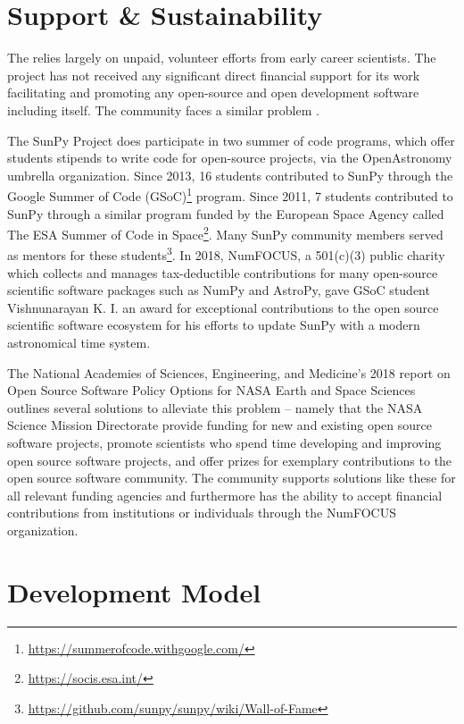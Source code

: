 \section{Support \& Sustainability}

The \sunpyproj relies largely on unpaid, volunteer efforts from early career scientists. 
The project has not received any significant direct financial support for its work facilitating and promoting any open-source and open development software including \sunpy itself. 
The \astropy community faces a similar problem \citep{PriceWhelan:2018ji, Muna2016}. 

The SunPy Project does participate in two summer of code programs, which offer students stipends to write code for open-source projects, via the OpenAstronomy umbrella organization. 
Since 2013, 16 students contributed to SunPy through the Google Summer of Code (GSoC)\footnote{\url{https://summerofcode.withgoogle.com/}} program. 
Since 2011, 7 students contributed to SunPy through a similar program funded by the European Space Agency called The ESA Summer of Code in Space\footnote{\url{https://socis.esa.int/}}. 
Many SunPy community members served as mentors for these students\footnote{\url{https://github.com/sunpy/sunpy/wiki/Wall-of-Fame}}. 
In 2018, NumFOCUS, a 501(c)(3) public charity which collects and manages tax-deductible contributions for many open-source scientific software packages such as NumPy and AstroPy, gave GSoC student Vishnunarayan K. I. an award for exceptional contributions to the open source scientific software ecosystem for his efforts to update SunPy with a modern astronomical time system.

The National Academies of Sciences, Engineering, and Medicine's 2018 report on Open Source Software Policy Options for NASA Earth and Space Sciences \citep{NAP2018} outlines several solutions to alleviate this problem -- namely that the NASA Science Mission Directorate provide funding for new and existing open source software projects, promote scientists who spend time developing and improving open source software projects, and offer prizes for exemplary contributions to the open source software community. 
The \sunpy community supports solutions like these for all relevant funding agencies and furthermore has the ability to accept financial contributions from institutions or individuals through the NumFOCUS organization.

\section{Development Model}

